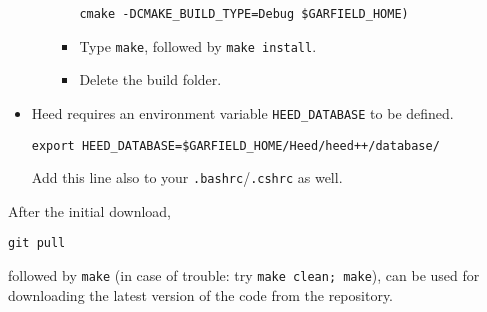 \begin{itemize}
\begin{enumerate}
\begin{itemize}
  \begin{lstlisting}
cmake -DCMAKE_BUILD_TYPE=Debug $GARFIELD_HOME)
  \end{lstlisting}
  \item
  Type \texttt{make}, followed by \texttt{make install}.
  \item
  Delete the build folder.
  \end{itemize}
  \end{enumerate}
  \item
  Heed requires an environment variable \texttt{HEED\_DATABASE}
  to be defined.
  \begin{lstlisting}
export HEED_DATABASE=$GARFIELD_HOME/Heed/heed++/database/
  \end{lstlisting}
  Add this line also to your \texttt{.bashrc}/\texttt{.cshrc} as well.
\end{itemize}

After the initial download,
\begin{lstlisting}
git pull
\end{lstlisting}
followed by \texttt{make} 
(in case of trouble: try \texttt{make clean; make}),
can be used for downloading the latest version of the code 
from the repository.

%
%

